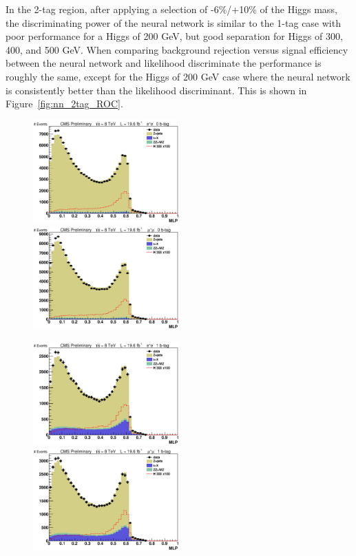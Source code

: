 In the 2-tag region, after applying a selection of -6\%/+10\% of the Higgs mass, the discriminating power of the neural network is similar to the 1-tag case with poor performance for a Higgs of 200 GeV, but good separation for Higgs of 300, 400, and 500 GeV.  When comparing background rejection versus signal efficiency between the neural network and likelihood discriminate the performance is roughly the same, except for the Higgs of 200 GeV case where the neural network is consistently better than the likelihood discriminant. This is shown in Figure~\ref{fig:nn_2tag_ROC}.


\begin{figure}[htb!]
  \centerline{
    \includegraphics[width=0.5\textwidth]{presentation/defense/images/preselection/0/el/MLP.eps}
    \includegraphics[width=0.5\textwidth]{presentation/defense/images/preselection/0/mu/MLP.eps}
  }
  \centerline{
    \includegraphics[width=0.5\textwidth]{presentation/defense/images/preselection/1/el/MLP.eps}
    \includegraphics[width=0.5\textwidth]{presentation/defense/images/preselection/1/mu/MLP.eps}
}
\end{figure}

